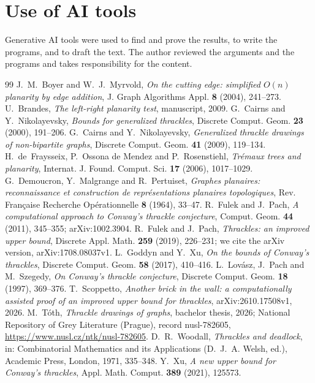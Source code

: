 \documentclass[11pt]{amsart}
\theoremstyle{definition}
\theoremstyle{remark}
\numberwithin{equation}{section}
\begin{document}
\section*{Use of AI tools}
Generative AI tools were used to find and prove the results, to write the programs, and to draft the text. The author reviewed the arguments and the programs and takes responsibility for the content.

\begin{thebibliography}{99}
 J.~M.~Boyer and W.~J.~Myrvold, \emph{On the cutting edge: simplified $O(n)$ planarity by edge addition}, J. Graph Algorithms Appl. \textbf{8} (2004), 241--273.
 U.~Brandes, \emph{The left-right planarity test}, manuscript, 2009.
 G.~Cairns and Y.~Nikolayevsky, \emph{Bounds for generalized thrackles}, Discrete Comput. Geom. \textbf{23} (2000), 191--206.
 G.~Cairns and Y.~Nikolayevsky, \emph{Generalized thrackle drawings of non-bipartite graphs}, Discrete Comput. Geom. \textbf{41} (2009), 119--134.
 H.~de~Fraysseix, P.~Ossona de Mendez and P.~Rosenstiehl, \emph{Tr\'emaux trees and planarity}, Internat. J. Found. Comput. Sci. \textbf{17} (2006), 1017--1029.
 G.~Demoucron, Y.~Malgrange and R.~Pertuiset, \emph{Graphes planaires: reconnaissance et construction de repr\'esentations planaires topologiques}, Rev. Fran\c{c}aise Recherche Op\'erationnelle \textbf{8} (1964), 33--47.
 R.~Fulek and J.~Pach, \emph{A computational approach to Conway's thrackle conjecture}, Comput. Geom. \textbf{44} (2011), 345--355; arXiv:1002.3904.
 R.~Fulek and J.~Pach, \emph{Thrackles: an improved upper bound}, Discrete Appl. Math. \textbf{259} (2019), 226--231; we cite the arXiv version, arXiv:1708.08037v1.
 L.~Goddyn and Y.~Xu, \emph{On the bounds of Conway's thrackles}, Discrete Comput. Geom. \textbf{58} (2017), 410--416.
 L.~Lov\'asz, J.~Pach and M.~Szegedy, \emph{On Conway's thrackle conjecture}, Discrete Comput. Geom. \textbf{18} (1997), 369--376.
 T.~Scoppetto, \emph{Another brick in the wall: a computationally assisted proof of an improved upper bound for thrackles}, arXiv:2610.17508v1, 2026.
 M.~T\'oth, \emph{Thrackle drawings of graphs}, bachelor thesis, 2026; National Repository of Grey Literature (Prague), record nusl-782605, \url{https://www.nusl.cz/ntk/nusl-782605}.
 D.~R.~Woodall, \emph{Thrackles and deadlock}, in: Combinatorial Mathematics and its Applications (D.~J.~A. Welsh, ed.), Academic Press, London, 1971, 335--348.
 Y.~Xu, \emph{A new upper bound for Conway's thrackles}, Appl. Math. Comput. \textbf{389} (2021), 125573.
\end{thebibliography}
\end{document}
